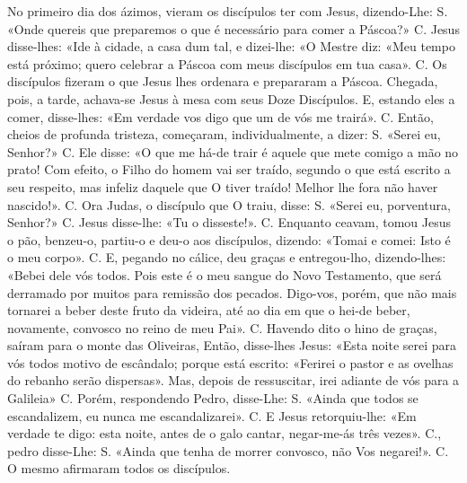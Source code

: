 \begin{paracol}{2}
{No primeiro dia dos ázimos, vieram os discípulos ter com Jesus, dizendo-Lhe: {\redx S.} «Onde quereis que preparemos o que é necessário para comer a Páscoa?» {\redx C.} Jesus disse-lhes: \cruz «Ide à cidade, a casa dum tal, e dizei-lhe: «O Mestre diz: «Meu tempo está próximo; quero celebrar a Páscoa com meus discípulos em tua casa». {\redx C.} Os discípulos fizeram o que Jesus lhes ordenara e prepararam a Páscoa. Chegada, pois, a tarde, achava-se Jesus à mesa com seus Doze Discípulos. E, estando eles a comer, disse-lhes: \cruz «Em verdade vos digo que um de vós me trairá». {\redx C.} Então, cheios de profunda tristeza, começaram, individualmente, a dizer: {\redx S.} «Serei eu, Senhor?» {\redx C.} Ele disse: \cruz «O que me há-de trair é aquele que mete comigo a mão no prato! Com efeito, o Filho do homem vai ser traído, segundo o que está escrito a seu respeito, mas infeliz daquele que O tiver traído! Melhor lhe fora não haver nascido!». {\redx C.} Ora Judas, o discípulo que O traiu, disse: {\redx S.} «Serei eu, porventura, Senhor?» {\redx C.} Jesus disse-lhe: \cruz «Tu o disseste!». {\redx C.} Enquanto ceavam, tomou Jesus o pão, benzeu-o, partiu-o e deu-o aos discípulos, dizendo: \cruz «Tomai e comei: Isto é o meu corpo». {\redx C.} E, pegando no cálice, deu graças e entregou-lho, dizendo-lhes: \cruz «Bebei dele vós todos. Pois este é o meu sangue do Novo Testamento, que será derramado por muitos para remissão dos pecados. Digo-vos, porém, que não mais tornarei a beber deste fruto da videira, até ao dia em que o hei-de beber, novamente, convosco no reino de meu Pai». {\redx C.} Havendo dito o hino de graças, saíram para o monte das Oliveiras, Então, disse-lhes Jesus: \cruz «Esta noite serei para vós todos motivo de escândalo; porque está escrito: «Ferirei o pastor e as ovelhas do rebanho serão dispersas». Mas, depois de ressuscitar, irei adiante de vós para a Galileia» {\redx C.} Porém, respondendo Pedro, disse-Lhe: {\redx S.} «Ainda que todos se escandalizem, eu nunca me escandalizarei». {\redx C.} E Jesus retorquiu-lhe: \cruz «Em verdade te digo: esta noite, antes de o galo cantar, negar-me-ás três vezes». {\redx C.}, pedro disse-Lhe: {\redx S.} «Ainda que tenha de morrer convosco, não Vos negarei!». {\redx C.} O mesmo afirmaram todos os discípulos.
}\switchcolumn*\latim{
}
\end{paracol}

